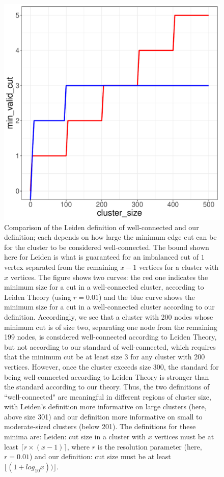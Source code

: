 \documentclass[12pt, oneside]{article}   	%
\begin{document}
\begin{figure}[H]
\centering
\includegraphics[width=0.7\linewidth]{tandys_figure_3.pdf}
\caption{Comparison of the Leiden definition of well-connected and our definition; each depends on how large the 
minimum edge cut can be for the cluster to be considered well-connected.  
The bound shown here for Leiden is what is guaranteed for an imbalanced cut of $1$ vertex separated from the remaining $x-1$ vertices 
for a cluster with $x$ vertices.
The figure shows two curves: the red one indicates the minimum size for a cut in a well-connected cluster,
according to Leiden Theory (using $r=0.01$) and the blue curve shows the minimum size for a cut in a well-connected cluster according to
our definition.   
Accordingly, we see that a cluster with 200 nodes whose minimum cut is of size two, separating one node from the remaining 199 nodes, is considered well-connected
according to Leiden Theory, but not according to our standard of well-connected, which requires that the minimum cut be at least size
3 for any cluster with 200 vertices.  However, once the cluster exceeds size 300, the standard for being well-connected according to
Leiden Theory is stronger than the standard according to our theory. Thus, the two definitions of ``well-connected"  are meaningful in different
regions of cluster size, with Leiden's definition more informative on large clusters (here, above size 301) and our definition more informative on small to moderate-sized clusters (below 201).
The definitions for these minima are: Leiden:  cut size  in a cluster with $x$ vertices must be at least $\lceil r \times (x-1) \rceil$, where $r$ is the resolution parameter (here, $r=0.01$)
and our definition: cut size must be at least $\lfloor(1 + log_{10}x))\rfloor$.}
\end{figure}
\end{document}
